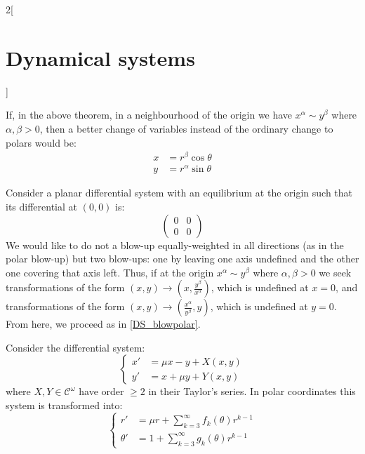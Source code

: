 \documentclass[../../../main_math.tex]{subfiles}
\begin{document}
\begin{multicols}{2}[\section{Dynamical systems}]
\begin{figure}[H]
    \label{DS_blowup}
  \end{figure}
  \begin{corollary}
    If, in the above theorem, in a neighbourhood of the origin we have $x^\alpha \sim y^\beta$ where $\alpha,\beta>0$, then a better change of variables instead of the ordinary change to polars would be:
    \begin{align*}
      x & =r^\beta\cos\theta  \\
      y & =r^\alpha\sin\theta
    \end{align*}
  \end{corollary}
  \begin{theorem}\label{DS_blowcarte}
    Consider a planar differential system with an equilibrium at the origin such that its differential at $(0,0)$ is:
    $$\begin{pmatrix}
        0 & 0 \\
        0 & 0
      \end{pmatrix}$$
    We would like to do not a blow-up equally-weighted in all directions (as in the polar blow-up) but two blow-ups: one by leaving one axis undefined and the other one covering that axis left. Thus, if at the origin $x^\alpha \sim y^\beta$ where $\alpha,\beta>0$ we seek transformations of the form $(x,y)\rightarrow\left(x,\frac{y^\beta}{x^\alpha}\right)$, which is undefined at $x=0$, and transformations of the form $(x,y)\rightarrow\left(\frac{x^\alpha}{y^\beta},y\right)$, which is undefined at $y=0$. From here, we proceed as in \cref{DS_blowpolar}.
  \end{theorem}
  \begin{proposition}
    Consider the differential system:
    \begin{equation}\label{DS_eqhopf}
      \left\{
      \begin{aligned}
        x' & =\mu x-y + X(x,y) \\
        y' & =x+\mu y + Y(x,y)
      \end{aligned}
      \right.
    \end{equation}
    where $X,Y\in\mathcal{C}^\omega$ have order $\geq 2$ in their Taylor's series. In polar coordinates this system is transformed into:
    $$
      \left\{
      \begin{aligned}
        r'      & =\mu r+  \sum_{k=3}^\infty f_{k}(\theta) r^{k-1} \\
        \theta' & =1+\sum_{k=3}^\infty g_{k}(\theta) r^{k-1}

\end{aligned}$$
\end{proposition}
\end{multicols}
\end{document}

